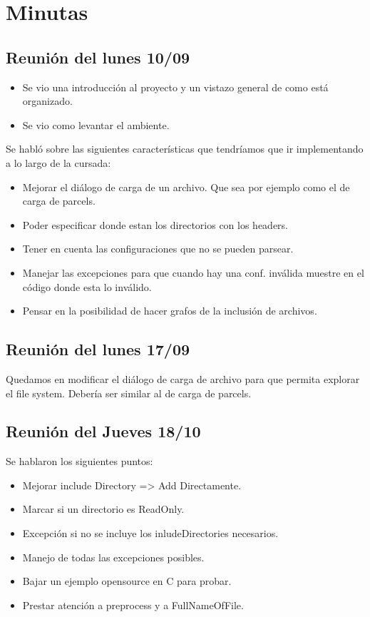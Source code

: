 \documentclass[a4paper,oneside,10pt]{article}
\begin{document}
\section{Minutas}

\subsection{Reunión del lunes 10/09}
\begin{itemize}
  \item Se vio una introducción al proyecto y un vistazo general de como está organizado.
  \item Se vio como levantar el ambiente.
\end{itemize}

Se habló sobre las siguientes características que tendríamos que ir implementando a lo largo de la cursada:
\begin{itemize}
  \item Mejorar el diálogo de carga de un archivo. Que sea por ejemplo como el de carga de parcels.
  \item Poder especificar donde estan los directorios con los headers.
  \item Tener en cuenta las configuraciones que no se pueden parsear.
  \item Manejar las excepciones para que cuando hay una conf. inválida muestre en el código donde esta lo inválido.
  \item Pensar en la posibilidad de hacer grafos de la inclusión de archivos.
\end{itemize}

\subsection{Reunión del lunes 17/09}
Quedamos en modificar el diálogo de carga de archivo para que permita explorar el file system. Debería ser similar al de carga de parcels.

\subsection{Reunión del Jueves 18/10}
Se hablaron los siguientes puntos:
\begin{itemize}
 \item Mejorar include Directory => Add Directamente.
 \item Marcar si un directorio es ReadOnly.
 \item Excepción si no se incluye los inludeDirectories necesarios. 
 \item Manejo de todas las excepciones posibles.
 \item Bajar un ejemplo opensource en C para probar.
 \item Prestar atención a preprocess y a FullNameOfFile.
\end{itemize}
\end{document}
